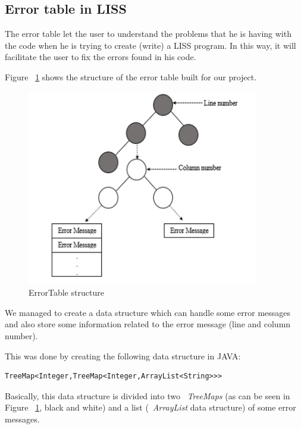 \documentclass[
  oneside,
  11pt, a4paper,
  footinclude=true,
  headinclude=true,
  cleardoublepage=empty
]{scrbook}
\begin{document}
\subsection{Error table in LISS}

The error table let the user to understand the problems that he is having with the code when he is trying to create (write) a LISS program.
In this way, it will facilitate the user to fix the errors found in his code.

Figure ~\ref{fig:error_table_structure} shows the structure of the error table built for our project.

\begin{figure}[h!]
  \centering
    \includegraphics[width=0.9\textwidth]{img/error_table_liss.png}
    \caption{ErrorTable structure}
    \label{fig:error_table_structure}
\end{figure}

We managed to create a data structure which can handle some error messages and also store some information related to the error message (line and column number).

This was done by creating the following data structure in JAVA:

\begin{lstlisting}[caption={Data structure of the error table in LISS},label={lst:error_table_liss_java_implementation}]
	TreeMap<Integer,TreeMap<Integer,ArrayList<String>>>
\end{lstlisting}

Basically, this data structure is divided into two ~\textit{TreeMaps} (as can be seen in Figure ~\ref{fig:error_table_structure}, black and white) and a list (~\textit{ArrayList} data structure) of some error messages.
\end{document}
